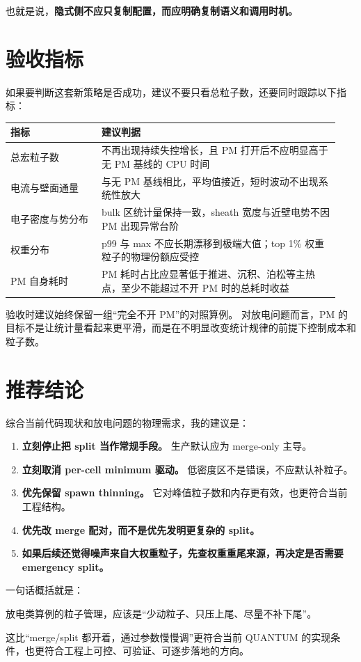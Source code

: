 \documentclass[UTF8,11pt,a4paper]{ctexart}
\begin{document}
也就是说，\textbf{隐式侧不应只复制配置，而应明确复制语义和调用时机。}

\section{验收指标}

如果要判断这套新策略是否成功，建议不要只看总粒子数，还要同时跟踪以下指标：

\begin{longtable}{p{0.26\linewidth}p{0.68\linewidth}}
\toprule
指标 & 建议判据 \\
\midrule
总宏粒子数 & 不再出现持续失控增长，且 PM 打开后不应明显高于无 PM 基线的 CPU 时间 \\
电流与壁面通量 & 与无 PM 基线相比，平均值接近，短时波动不出现系统性放大 \\
电子密度与势分布 & bulk 区统计量保持一致，sheath 宽度与近壁电势不因 PM 出现异常台阶 \\
权重分布 & p99 与 max 不应长期漂移到极端大值；top 1\% 权重粒子的物理份额应受控 \\
PM 自身耗时 & PM 耗时占比应显著低于推进、沉积、泊松等主热点，至少不能超过不开 PM 时的总耗时收益 \\
\bottomrule
\end{longtable}

验收时建议始终保留一组“完全不开 PM”的对照算例。
对放电问题而言，PM 的目标不是让统计量看起来更平滑，而是在不明显改变统计规律的前提下控制成本和粒子数。

\section{推荐结论}

综合当前代码现状和放电问题的物理需求，我的建议是：
\begin{enumerate}[itemsep=3pt]
  \item \textbf{立刻停止把 split 当作常规手段。} 生产默认应为 merge-only 主导。
  \item \textbf{立刻取消 per-cell minimum 驱动。} 低密度区不是错误，不应默认补粒子。
  \item \textbf{优先保留 spawn thinning。} 它对峰值粒子数和内存更有效，也更符合当前工程结构。
  \item \textbf{优先改 merge 配对，而不是优先发明更复杂的 split。}
  \item \textbf{如果后续还觉得噪声来自大权重粒子，先查权重重尾来源，再决定是否需要 emergency split。}
\end{enumerate}

一句话概括就是：
\begin{center}
\large
放电类算例的粒子管理，应该是“少动粒子、只压上尾、尽量不补下尾”。
\end{center}

这比“merge/split 都开着，通过参数慢慢调”更符合当前 QUANTUM 的实现条件，也更符合工程上可控、可验证、可逐步落地的方向。
\end{document}
